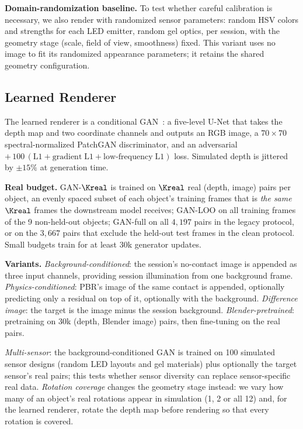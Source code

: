 \noindent\textbf{Domain-randomization baseline.} To test whether careful calibration is necessary, we also render with randomized sensor parameters: random HSV colors and strengths for each LED emitter, random gel optics, per session, with the geometry stage (scale, field of view, smoothness) fixed. This variant uses no image to fit its randomized appearance parameters; it retains the shared geometry configuration.

\subsection{Learned Renderer}
\label{sec:gan}
The learned renderer is a conditional GAN~\cite{isola2017pix2pix}: a five-level U-Net that takes the depth map and two coordinate channels and outputs an RGB image, a $70\times70$ spectral-normalized PatchGAN discriminator, and an adversarial $+\,100\,(\mathrm{L1} + \mathrm{gradient\;L1} + \mathrm{low\text{-}frequency\;L1})$ loss. Simulated depth is jittered by $\pm15\%$ at generation time.

\noindent\textbf{Real budget.} GAN-$\Kreal$ is trained on $\Kreal$ real (depth, image) pairs per object, an evenly spaced subset of each object's training frames that is \emph{the same} $\Kreal$ frames the downstream model receives; GAN-LOO on all training frames of the 9 non-held-out objects; GAN-full on all $4{,}197$ pairs in the legacy protocol, or on the $3{,}667$ pairs that exclude the held-out test frames in the clean protocol. Small budgets train for at least $30$k generator updates.

\noindent\textbf{Variants.} \emph{Background-conditioned}: the session's no-contact image is appended as three input channels, providing session illumination from one background frame. \emph{Physics-conditioned}: PBR's image of the same contact is appended, optionally predicting only a residual on top of it, optionally with the background. \emph{Difference image}: the target is the image minus the session background. \emph{Blender-pretrained}: pretraining on $30$k (depth, Blender image) pairs, then fine-tuning on the real pairs.

\emph{Multi-sensor}: the background-conditioned GAN is trained on 100 simulated sensor designs (random LED layouts and gel materials) plus optionally the target sensor's real pairs; this tests whether sensor diversity can replace sensor-specific real data. \emph{Rotation coverage} changes the geometry stage instead: we vary how many of an object's real rotations appear in simulation (1, 2 or all 12) and, for the learned renderer, rotate the depth map before rendering so that every rotation is covered.

